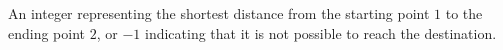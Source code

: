 An integer representing the shortest distance from the starting point $1$ to the ending point $2$, or $-1$ indicating that it is not possible to reach the destination.